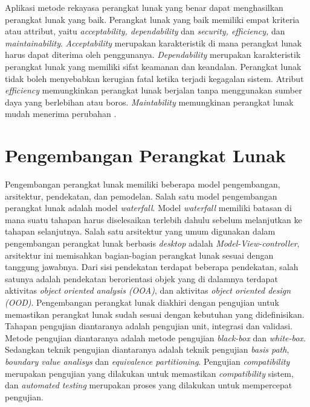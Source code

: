 Aplikasi metode rekayasa perangkat lunak yang benar dapat
menghasilkan perangkat lunak yang baik. Perangkat lunak yang baik
memiliki empat kriteria atau attribut, yaitu \emph{acceptability,
  dependability} dan \emph{security, efficiency,} dan
\emph{maintainability}. \emph{Acceptability} merupakan karakteristik
di mana perangkat lunak harus dapat diterima oleh
penggunanya. \emph{Dependability} merupakan karakteristik perangkat
lunak yang memiliki sifat keamanan dan keandalan. Perangkat lunak
tidak boleh menyebabkan kerugian fatal ketika terjadi kegagalan
sistem. Atribut \emph{efficiency} memungkinkan perangkat lunak
berjalan tanpa menggunakan sumber daya yang berlebihan atau boros.
\emph{Maintability} memungkinan perangkat lunak mudah menerima
perubahan \parencite{sommerville2016software}.

\section{Pengembangan Perangkat Lunak}


Pengembangan perangkat lunak memiliki beberapa model pengembangan,
arsitektur, pendekatan, dan pemodelan. Salah satu model pengembangan
perangkat lunak adalah model \emph{waterfall}. Model \emph{waterfall} memiliki
batasan di mana suatu tahapan harus diselesaikan terlebih dahulu
sebelum melanjutkan ke tahapan selanjutnya. Salah satu
arsitektur yang umum digunakan dalam pengembangan perangkat lunak
berbasis \emph{desktop} adalah \emph{Model-View-controller},
arsitektur ini memisahkan bagian-bagian perangkat lunak sesuai dengan
tanggung jawabnya. Dari sisi pendekatan terdapat beberapa pendekatan,
salah satunya adalah pendekatan berorientasi objek yang di dalamnya
terdapat aktivitas \emph{object oriented analysis (OOA)}, dan
aktivitas \emph{object oriented design (OOD)}. Pengembangan perangkat
lunak diakhiri dengan pengujian untuk memastikan perangkat lunak sudah
sesuai dengan kebutuhan yang didefinisikan. Tahapan pengujian
diantaranya adalah pengujian unit, integrasi dan validasi. Metode
pengujian diantaranya adalah metode pengujian \emph{black-box} dan
\emph{white-box}. Sedangkan teknik pengujian diantaranya adalah teknik
pengujian \emph{basis path}, \emph{boundary value analisys} dan
\emph{equivalence partitioning}. Pengujian \emph{compatibility}
merupakan pengujian yang dilakukan untuk memastikan
\emph{compatibility} sistem, dan \emph{automated testing} merupakan
proses yang dilakukan untuk mempercepat pengujian.

